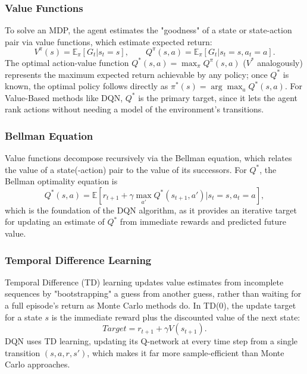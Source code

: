 \subsubsection{Value Functions}

To solve an MDP, the agent estimates the "goodness" of a state or state-action pair via value functions, which estimate expected return:
\begin{equation}
V^\pi(s) = \mathbb{E}_\pi [G_t | s_t = s], \qquad Q^\pi(s, a) = \mathbb{E}_\pi [G_t | s_t = s, a_t = a].
\end{equation}
The optimal action-value function $Q^*(s, a) = \max_\pi Q^\pi(s, a)$ ($V^*$ analogously) represents the maximum expected return achievable by any policy; once $Q^*$ is known, the optimal policy follows directly as $\pi^*(s) = \arg\max_a Q^*(s, a)$. For Value-Based methods like DQN, $Q^*$ is the primary target, since it lets the agent rank actions without needing a model of the environment's transitions.

\subsubsection{Bellman Equation}
Value functions decompose recursively via the Bellman equation, which relates the value of a state(-action) pair to the value of its successors. For $Q^*$, the Bellman optimality equation is
\begin{equation}
    Q^*(s, a) = \mathbb{E} [r_{t+1} + \gamma \max_{a'} Q^*(s_{t+1}, a') | s_t=s, a_t=a],
\end{equation}
which is the foundation of the DQN algorithm, as it provides an iterative target for updating an estimate of $Q^*$ from immediate rewards and predicted future value.

\subsubsection{Temporal Difference Learning}
Temporal Difference (TD) learning updates value estimates from incomplete sequences by "bootstrapping" a guess from another guess, rather than waiting for a full episode's return as Monte Carlo methods do. In TD(0), the update target for a state $s$ is the immediate reward plus the discounted value of the next state:
\begin{equation}
    Target = r_{t+1} + \gamma V(s_{t+1}).
\end{equation}
DQN uses TD learning, updating its Q-network at every time step from a single transition $(s, a, r, s')$, which makes it far more sample-efficient than Monte Carlo approaches.

